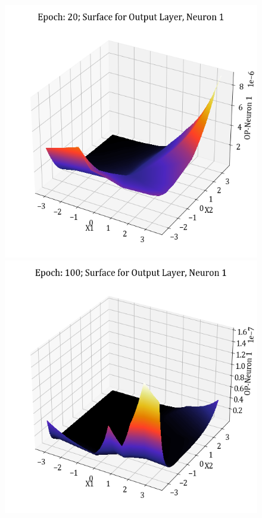 \documentclass[11pt,a4paper]{article}
\begin{document}
\begin{figure}[H]
    \includegraphics[scale=0.4]{images/1B_MLFFNN_E20_OP_N1.png}
    \includegraphics[scale=0.4]{images/1B_MLFFNN_E100_OP_N1.png}

\end{figure}
\end{document}
